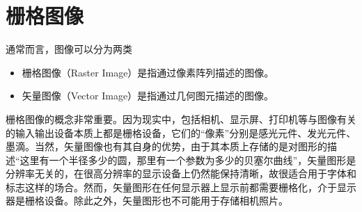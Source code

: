 \chapter{栅格图像}
通常而言，图像可以分为两类
\begin{itemize}
    \item 栅格图像（Raster Image）是指通过像素阵列描述的图像。
    \item 矢量图像（Vector Image）是指通过几何图元描述的图像。
\end{itemize}

栅格图像的概念非常重要。因为现实中，包括相机、显示屏、打印机等与图像有关的输入输出设备本质上都是栅格设备，它们的“像素”分别是感光元件、发光元件、墨滴。当然，矢量图像也有其自身的优势，由于其本质上存储的是对图形的描述“这里有一个半径多少的圆，那里有一个参数为多少的贝塞尔曲线”，矢量图形是分辨率无关的，在很高分辨率的显示设备上仍然能保持清晰，故很适合用于字体和标志这样的场合。然而，矢量图形在任何显示器上显示前都需要栅格化，介于显示器是栅格设备。除此之外，矢量图形也不可能用于存储相机照片。


